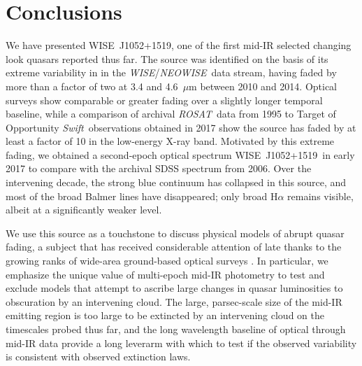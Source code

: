 \documentclass[iop]{emulateapj}
\def\eg{{e.g.}}
\def\wise{{\it WISE}}
\def\neowise{{\it NEOWISE}}
\def\rosat{{\it ROSAT}}
\def\swift{{\it Swift}}
\def\qso{WISE~J1052+1519}
\begin{document}


\section{Conclusions}

We have presented \qso, one of the first mid-IR selected changing
look quasars reported thus far.  The source was identified on the
basis of its extreme variability in in the \wise/\neowise\ data
stream, having faded by more than a factor of two at 3.4 and
4.6~$\mu$m between 2010 and 2014.  Optical surveys show comparable
or greater fading over a slightly longer temporal baseline, while
a comparison of archival \rosat\ data from 1995 to Target of
Opportunity \swift\ observations obtained in 2017 show the source
has faded by at least a factor of 10 in the low-energy X-ray band.
Motivated by this extreme fading, we obtained a second-epoch optical
spectrum \qso\ in early 2017 to compare with the archival SDSS
spectrum from 2006.  Over the intervening decade, the strong blue
continuum has collapsed in this source, and most of the broad Balmer
lines have disappeared; only broad H$\alpha$ remains visible, albeit
at a significantly weaker level.

We use this source as a touchstone to discuss physical models of
abrupt quasar fading, a subject that has received considerable
attention of late thanks to the growing ranks of wide-area ground-based
optical surveys \citep[\eg,][]{LaMassa:15, Macleod:16, Ruan:16a,
Ruan:16b, Runnoe:16, Gezari:17, Sheng:17, Yang:17, Assef:18, Ross:18}.
In particular, we emphasize the unique value of multi-epoch mid-IR
photometry to test and exclude models that attempt to ascribe large
changes in quasar luminosities to obscuration by an intervening
cloud.  The large, parsec-scale size of the mid-IR emitting region
is too large to be extincted by an intervening cloud on the timescales
probed thus far, and the long wavelength baseline of optical through
mid-IR data provide a long leverarm with which to test if the
observed variability is consistent with observed extinction laws.  
\end{document}
